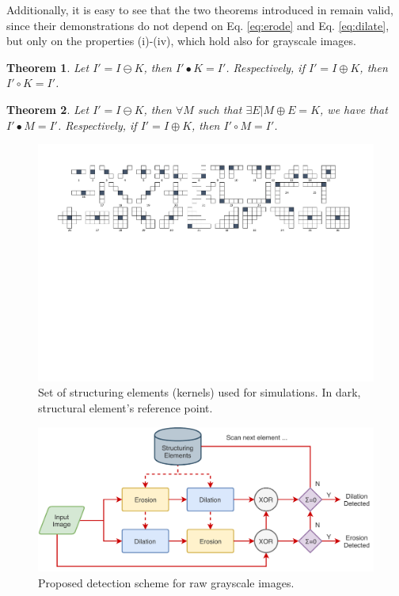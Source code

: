 \documentclass{ieeeaccess}
\newtheorem{theorem}{Theorem}
\begin{document}
Additionally, it is easy to see that the two theorems introduced in \cite{de2017detecting} remain valid, since their demonstrations do not depend on Eq. \ref{eq:erode} and Eq. \ref{eq:dilate}, but only on the properties (i)-(iv), which hold also for grayscale images.

\begin{theorem}
	\label{theorem_1}
	Let $I' = I \ominus K$, then $I'\bullet K = I'$. Respectively, if $I' = I \oplus K$, then $I'\circ K = I'$.
\end{theorem}

\begin{theorem}
	\label{theorem_2}
	Let $I' = I \ominus K$, then $\forall M$ such that $\exists E | M \oplus E = K$, we have that $I' \bullet M = I'$. Respectively, if $I' = I \oplus K$, then $I' \circ M = I'$.
\end{theorem}

\begin{figure}[h!]
	\centering
	\includegraphics[width=\linewidth]{kernels}
	\caption{Set of structuring elements (kernels) used for simulations. In dark, structural element's reference point.}
	\label{fig:masks}
\end{figure}
\begin{figure}[h]
	\centering
	\includegraphics[width=0.7\linewidth]{diagram1}
	\caption{Proposed detection scheme for raw grayscale images.}
	\label{fig:scheme}
\end{figure}
\end{document}
